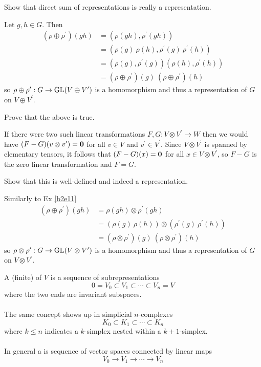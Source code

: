 \documentclass[10pt]{article}
\begin{document}
\begin{example}\label{b2e11}
	Show that direct sum of representations is really a representation.
\end{example}
\sol Let $g,h \in G$. Then
$$
\begin{aligned}
	(\rho \oplus \rho^\prime)(gh) &= (\rho(gh), \rho^\prime(gh))\\
	&= (\rho(g)\:\rho(h), \rho^\prime(g)\:\rho^\prime(h))\\
	&= (\rho(g), \rho^\prime(g))(\rho(h), \rho^\prime(h))\\
	&= (\rho \oplus \rho^\prime)(g)\:(\rho \oplus \rho^\prime)(h)
\end{aligned}
$$ 
so $\rho \oplus \rho^\prime: G \to \text{GL}(V \oplus V^\prime)$ is a homomorphism and thus a representation of $G$ on $V \oplus V^\prime$.

\begin{example}
	Prove that the above is true.
\end{example}
\sol If there were two such linear transformations $F,G:V\otimes V^\prime \to W$ then we would have $(F-G)(v \otimes v^\prime) = \textbf{0}$ for all $v \in V$ and $v^\prime \in V^\prime$. Since $V\otimes V^\prime$ is spanned by elementary tensors, it follows that $(F-G)(x) = \textbf{0}$ for all $x \in V\otimes V^\prime$, so $F-G$ is the zero linear transformation and $F=G$.


\begin{example}
	Show that this is well-defined and indeed a representation.
\end{example}
\sol Similarly to Ex \ref{b2e11}
$$
\begin{aligned}
	(\rho \oplus \rho^\prime)(gh) &= \rho(gh) \otimes \rho^\prime(gh)\\
	&= (\rho(g)\:\rho(h)) \otimes (\rho^\prime(g)\:\rho^\prime(h))\\
	&= (\rho \otimes \rho^\prime)(g)\:(\rho \otimes \rho^\prime)(h)
\end{aligned}
$$
so $\rho \otimes \rho^\prime: G \to \text{GL}(V \otimes V^\prime)$ is a homomorphism and thus a representation of $G$ on $V \otimes V^\prime$.


\begin{definition}
	A (finite)  of $V$ is a sequence of subrepresentations
	$$0=V_0 \subset V_1 \subset \cdots \subset V_n =V$$
	where the two ends are invariant subspaces.\\\\
	The same concept shows up in simplicial $n$-complexes 
	$$K_0 \subset K_1 \subset \cdots \subset K_n$$
	where $k \le n$ indicates a $k$-simplex nested within a $k+1$-simplex.\\\\
	In general a  is sequence of vector spaces connected by linear maps
	$$V_0 \to V_1 \to \cdots \to V_n$$
\end{definition}
\end{document}
